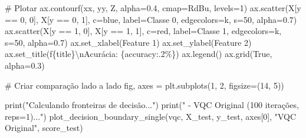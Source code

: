 \documentclass[
  brazilian,
]{report}
\newenvironment{Shaded}{\begin{snugshade}}{\end{snugshade}}
\newcommand{\BuiltInTok}[1]{\textcolor[rgb]{0.00,0.23,0.31}{#1}}
\newcommand{\CharTok}[1]{\textcolor[rgb]{0.13,0.47,0.30}{#1}}
\newcommand{\CommentTok}[1]{\textcolor[rgb]{0.37,0.37,0.37}{#1}}
\newcommand{\DecValTok}[1]{\textcolor[rgb]{0.68,0.00,0.00}{#1}}
\newcommand{\FloatTok}[1]{\textcolor[rgb]{0.68,0.00,0.00}{#1}}
\newcommand{\NormalTok}[1]{\textcolor[rgb]{0.00,0.23,0.31}{#1}}
\newcommand{\OperatorTok}[1]{\textcolor[rgb]{0.37,0.37,0.37}{#1}}
\newcommand{\SpecialCharTok}[1]{\textcolor[rgb]{0.37,0.37,0.37}{#1}}
\newcommand{\SpecialStringTok}[1]{\textcolor[rgb]{0.13,0.47,0.30}{#1}}
\newcommand{\StringTok}[1]{\textcolor[rgb]{0.13,0.47,0.30}{#1}}
\newcommand{\VariableTok}[1]{\textcolor[rgb]{0.07,0.07,0.07}{#1}}
\begin{document}
\begin{tcolorbox}
\begin{Shaded}
\begin{Highlighting}[]
    \CommentTok{\# Plotar}
\NormalTok{    ax.contourf(xx, yy, Z, alpha}\OperatorTok{=}\FloatTok{0.4}\NormalTok{, cmap}\OperatorTok{=}\StringTok{\textquotesingle{}RdBu\textquotesingle{}}\NormalTok{, levels}\OperatorTok{=}\DecValTok{1}\NormalTok{)}
\NormalTok{    ax.scatter(X[y }\OperatorTok{==} \DecValTok{0}\NormalTok{, }\DecValTok{0}\NormalTok{], X[y }\OperatorTok{==} \DecValTok{0}\NormalTok{, }\DecValTok{1}\NormalTok{], c}\OperatorTok{=}\StringTok{\textquotesingle{}blue\textquotesingle{}}\NormalTok{, label}\OperatorTok{=}\StringTok{\textquotesingle{}Classe 0\textquotesingle{}}\NormalTok{, }
\NormalTok{                edgecolors}\OperatorTok{=}\StringTok{\textquotesingle{}k\textquotesingle{}}\NormalTok{, s}\OperatorTok{=}\DecValTok{50}\NormalTok{, alpha}\OperatorTok{=}\FloatTok{0.7}\NormalTok{)}
\NormalTok{    ax.scatter(X[y }\OperatorTok{==} \DecValTok{1}\NormalTok{, }\DecValTok{0}\NormalTok{], X[y }\OperatorTok{==} \DecValTok{1}\NormalTok{, }\DecValTok{1}\NormalTok{], c}\OperatorTok{=}\StringTok{\textquotesingle{}red\textquotesingle{}}\NormalTok{, label}\OperatorTok{=}\StringTok{\textquotesingle{}Classe 1\textquotesingle{}}\NormalTok{, }
\NormalTok{                edgecolors}\OperatorTok{=}\StringTok{\textquotesingle{}k\textquotesingle{}}\NormalTok{, s}\OperatorTok{=}\DecValTok{50}\NormalTok{, alpha}\OperatorTok{=}\FloatTok{0.7}\NormalTok{)}
\NormalTok{    ax.set\_xlabel(}\StringTok{\textquotesingle{}Feature 1\textquotesingle{}}\NormalTok{)}
\NormalTok{    ax.set\_ylabel(}\StringTok{\textquotesingle{}Feature 2\textquotesingle{}}\NormalTok{)}
\NormalTok{    ax.set\_title(}\SpecialStringTok{f\textquotesingle{}}\SpecialCharTok{\{}\NormalTok{title}\SpecialCharTok{\}}\CharTok{\textbackslash{}n}\SpecialStringTok{Acurácia: }\SpecialCharTok{\{}\NormalTok{accuracy}\SpecialCharTok{:.2\%\}}\SpecialStringTok{\textquotesingle{}}\NormalTok{)}
\NormalTok{    ax.legend()}
\NormalTok{    ax.grid(}\VariableTok{True}\NormalTok{, alpha}\OperatorTok{=}\FloatTok{0.3}\NormalTok{)}

\CommentTok{\# Criar comparação lado a lado}
\NormalTok{fig, axes }\OperatorTok{=}\NormalTok{ plt.subplots(}\DecValTok{1}\NormalTok{, }\DecValTok{2}\NormalTok{, figsize}\OperatorTok{=}\NormalTok{(}\DecValTok{14}\NormalTok{, }\DecValTok{5}\NormalTok{))}

\BuiltInTok{print}\NormalTok{(}\StringTok{"Calculando fronteiras de decisão..."}\NormalTok{)}
\BuiltInTok{print}\NormalTok{(}\StringTok{"  {-} VQC Original (100 iterações, reps=1)..."}\NormalTok{)}
\NormalTok{plot\_decision\_boundary\_single(vqc, X\_test, y\_test, axes[}\DecValTok{0}\NormalTok{], }
                              \StringTok{"VQC Original"}\NormalTok{, score\_test)}


\end{Highlighting}
\end{Shaded}
\end{tcolorbox}
\end{document}
